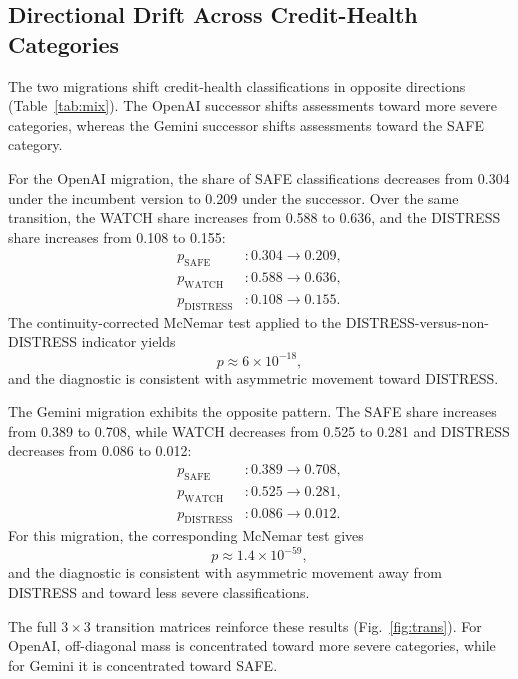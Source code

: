 \documentclass[11pt]{article}
\begin{document}
\subsection{Directional Drift Across Credit-Health Categories}
The two migrations shift credit-health classifications in opposite directions (Table~\ref{tab:mix}). The OpenAI successor shifts assessments toward more severe categories, whereas the Gemini successor shifts assessments toward the SAFE category.

For the OpenAI migration, the share of SAFE classifications decreases from 0.304 under the incumbent version to 0.209 under the successor. Over the same transition, the WATCH share increases from 0.588 to 0.636, and the DISTRESS share increases from 0.108 to 0.155:
\begin{equation}
\begin{aligned}
p_{\mathrm{SAFE}} &: 0.304 \rightarrow 0.209,\\
p_{\mathrm{WATCH}} &: 0.588 \rightarrow 0.636,\\
p_{\mathrm{DISTRESS}} &: 0.108 \rightarrow 0.155.
\end{aligned}
\end{equation}
The continuity-corrected McNemar test applied to the DISTRESS-versus-non-DISTRESS indicator yields
\begin{equation}
p \approx 6\times10^{-18},
\end{equation}
and the diagnostic is consistent with asymmetric movement toward DISTRESS.

The Gemini migration exhibits the opposite pattern. The SAFE share increases from 0.389 to 0.708, while WATCH decreases from 0.525 to 0.281 and DISTRESS decreases from 0.086 to 0.012:
\begin{equation}
\begin{aligned}
p_{\mathrm{SAFE}} &: 0.389 \rightarrow 0.708,\\
p_{\mathrm{WATCH}} &: 0.525 \rightarrow 0.281,\\
p_{\mathrm{DISTRESS}} &: 0.086 \rightarrow 0.012.
\end{aligned}
\end{equation}
For this migration, the corresponding McNemar test gives
\begin{equation}
p \approx 1.4\times10^{-59},
\end{equation}
and the diagnostic is consistent with asymmetric movement away from DISTRESS and toward less severe classifications.

The full $3\times3$ transition matrices reinforce these results (Fig.~\ref{fig:trans}). For OpenAI, off-diagonal mass is concentrated toward more severe categories, while for Gemini it is concentrated toward SAFE.
\end{document}
